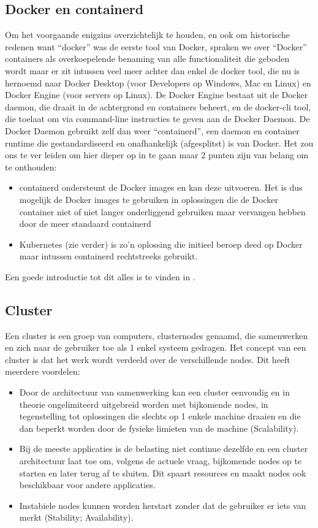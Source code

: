 \subsection{Docker en containerd}
Om het voorgaande enigzins overzichtelijk te houden, en ook om historische redenen want ``docker'' was de eerste tool van Docker, spraken we over ``Docker'' containers als overkoepelende benaming van alle functionaliteit die geboden wordt maar er zit intussen veel meer achter dan enkel de docker tool, die nu is hernoemd naar Docker Desktop (voor Developers op Windows, Mac en Linux) en Docker Engine (voor servers op Linux).
De Docker Engine bestaat uit de Docker daemon, die draait in de achtergrond en containers beheert, en de docker-cli tool, die toelaat om via command-line instructies te geven aan de Docker Daemon.
De Docker Daemon gebruikt zelf dan weer ``containerd'', een daemon en container runtime die gestandardiseerd en onafhankelijk (afgesplitst) is van Docker. Het zou ons te ver leiden om hier dieper op in te gaan maar 2 punten zijn van belang om te onthouden:
\begin{itemize}
    \item containerd ondersteunt de Docker images en kan deze uitvoeren. Het is dus mogelijk de Docker images te gebruiken in oplossingen die de Docker container niet of niet langer onderliggend gebruiken maar vervangen hebben door de meer standaard containerd
    \item Kubernetes (zie verder) is zo'n oplossing die initieel beroep deed op Docker maar intussen containerd rechtstreeks gebruikt.
\end{itemize}

Een goede introductie tot dit alles is te vinden in \textcite{Donohue2023}.


\subsection{Cluster}
Een cluster is een groep van computers, clusternodes genaamd, die samenwerken en zich naar de gebruiker toe als 1 enkel systeem gedragen. Het concept van een cluster is dat het werk wordt verdeeld over de verschillende nodes.
Dit heeft meerdere voordelen:
\newline
\begin{itemize}
    \item Door de architectuur van samenwerking kan een cluster eenvoudig en in theorie ongelimiteerd uitgebreid worden met bijkomende nodes, in tegenstelling tot oplossingen die slechts op 1 enkele machine draaien en die dan beperkt worden door de fysieke limieten van de machine (Scalability).
    \item Bij de meeste applicaties is de belasting niet continue dezelfde en een cluster architectuur laat toe om, volgens de actuele vraag, bijkomende nodes op te starten en later terug af te sluiten. Dit spaart resources en maakt nodes ook beschikbaar voor andere applicaties.
    \item Instabiele nodes kunnen worden herstart zonder dat de gebruiker er iets van merkt (Stability; Availability).
\end{itemize}

